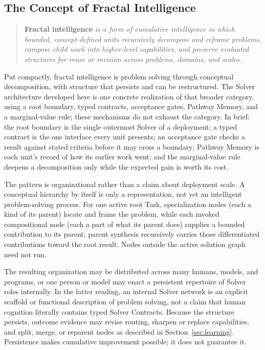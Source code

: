 \documentclass[11pt]{article}
\begin{document}
\subsection{The Concept of Fractal Intelligence}
\label{sec:why-fractal}

\begin{quote}
\textbf{Fractal intelligence} \emph{is a form of cumulative intelligence in which bounded, concept-defined units recursively decompose and reframe problems, compose child work into higher-level capabilities, and preserve evaluated structures for reuse or revision across problems, domains, and scales.}
\end{quote}

Put compactly, fractal intelligence is problem solving through conceptual decomposition, with structure that persists and can be restructured. The Solver architecture developed here is one concrete realization of that broader category, using a root boundary, typed contracts, acceptance gates, Pathway Memory, and a marginal-value rule; these mechanisms do not exhaust the category. In brief: the root boundary is the single outermost Solver of a deployment; a typed contract is the one interface every unit presents; an acceptance gate checks a result against stated criteria before it may cross a boundary; Pathway Memory is each unit's record of how its earlier work went; and the marginal-value rule deepens a decomposition only while the expected gain is worth its cost.

The pattern is organizational rather than a claim about deployment scale. A conceptual hierarchy by itself is only a representation, not yet an intelligent problem-solving process. For one active root Task, specialization nodes (each a kind of its parent) locate and frame the problem, while each invoked compositional node (each a part of what its parent does) supplies a bounded contribution to its parent; parent synthesis recursively carries those differentiated contributions toward the root result. Nodes outside the active solution graph need not run.

The resulting organization may be distributed across many humans, models, and programs, or one person or model may enact a persistent repertoire of Solver roles internally. In the latter reading, an internal Solver network is an explicit scaffold or functional description of problem solving, not a claim that human cognition literally contains typed Solver Contracts. Because the structure persists, outcome evidence may revise routing, sharpen or replace capabilities, and split, merge, or reparent nodes as described in Section~\ref{sec:learning}. Persistence makes cumulative improvement possible; it does not guarantee it.
\end{document}
